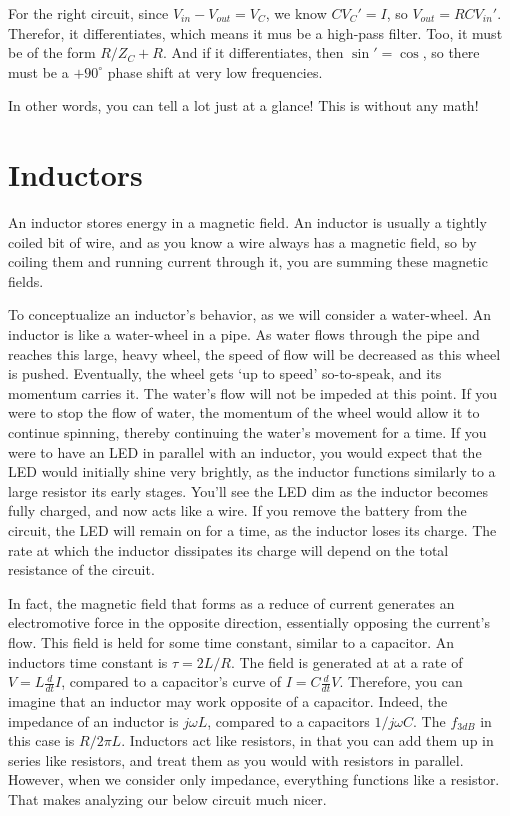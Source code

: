 \documentclass[12pt]{report}
\newcommand{\Vo}{{V}_{out}}
\newcommand{\Vi}{{V}_{in}}
\newcommand{\fdb}{{f}_{3dB}}
\begin{document}
For the right circuit, since $\Vi - \Vo = V_C$, we know $CV_C' = I$, so $\Vo = RC\Vi'$. Therefor, it differentiates, which means it mus be a high-pass filter. Too, it must be of the form $R/Z_C + R$. And if it differentiates, then $\sin ' = \cos$, so there must be a $+90^{\circ}$ phase shift at very low frequencies.\newline

In other words, you can tell a lot just at a glance! This is without any math!

\section{Inductors}
An inductor stores energy in a magnetic field. An inductor is usually a tightly coiled bit of wire, and as you know a wire always has a magnetic field, so by coiling them and running current through it, you are summing these magnetic fields.\newline

To conceptualize an inductor's behavior, as we will consider a water-wheel. An inductor is like a water-wheel in a pipe. As water flows through the pipe and reaches this large, heavy wheel, the speed of flow will be decreased as this wheel is pushed. Eventually, the wheel gets `up to speed' so-to-speak, and its momentum carries it. The water's flow will not be impeded at this point. If you were to stop the flow of water, the momentum of the wheel would allow it to continue spinning, thereby continuing the water's movement for a time. If you were to have an LED in parallel with an inductor, you would expect that the LED would initially shine very brightly, as the inductor functions similarly to a large resistor its early stages. You'll see the LED dim as the inductor becomes fully charged, and now acts like a wire. If you remove the battery from the circuit, the LED will remain on for a time, as the inductor loses its charge. The rate at which the inductor dissipates its charge will depend on the total resistance of the circuit.\newline

In fact, the magnetic field that forms as a reduce of current generates an electromotive force in the opposite direction, essentially opposing the current's flow. This field is held for some time constant, similar to a capacitor. An inductors time constant is $\tau = 2L/R$. The field is generated at at a rate of $V = L\frac{d}{dt}I$, compared to a capacitor's curve of $I = C\frac{d}{dt}V$. Therefore, you can imagine that an inductor may work opposite of a capacitor. Indeed, the impedance of an inductor is $j\omega L$, compared to a capacitors $1/ j\omega C$. The $\fdb$ in this case is $R/2\pi L$. Inductors act like resistors, in that you can add them up in series like resistors, and treat them as you would with resistors in parallel. However, when we consider only impedance, everything functions like a resistor. That makes analyzing our below circuit much nicer. 
\end{document}
